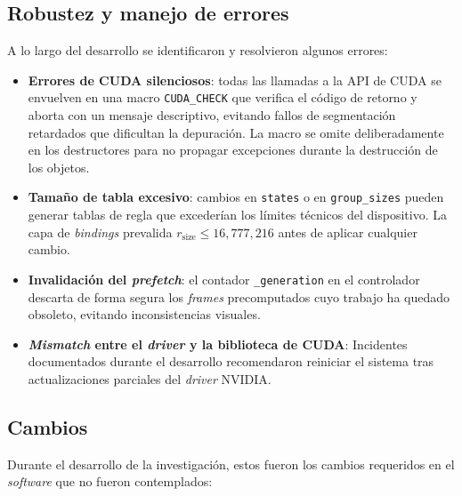 \subsection{Robustez y manejo de errores}

A lo largo del desarrollo se identificaron y resolvieron algunos errores:

\begin{itemize}
    \item \textbf{Errores de CUDA silenciosos}: todas las llamadas a la API de CUDA se envuelven en una macro \texttt{CUDA\_CHECK} que verifica el código de retorno y aborta con un mensaje descriptivo, evitando fallos de segmentación retardados que dificultan la depuración. La macro se omite deliberadamente en los destructores para no propagar excepciones durante la destrucción de los objetos.
    \item \textbf{Tamaño de tabla excesivo}: cambios en \texttt{states} o en \texttt{group\_sizes} pueden generar tablas de regla que excederían los límites técnicos del dispositivo. La capa de \textit{bindings} prevalida $r_{\text{size}} \leq 16{,}777{,}216$ antes de aplicar cualquier cambio.
    \item \textbf{Invalidación del \textit{prefetch}}: el contador \texttt{\_generation} en el controlador descarta de forma segura los \textit{frames} precomputados cuyo trabajo ha quedado obsoleto, evitando inconsistencias visuales.
    \item \textbf{\textit{Mismatch} entre el \textit{driver} y la biblioteca de CUDA}: Incidentes documentados durante el desarrollo recomendaron reiniciar el sistema tras actualizaciones parciales del \textit{driver} NVIDIA.
\end{itemize}

\subsection{Cambios}

Durante el desarrollo de la investigación, estos fueron los cambios requeridos en el \textit{software} que no fueron contemplados:


